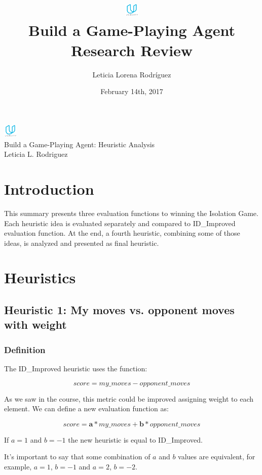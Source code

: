 \documentclass[10pt, a4paper,english]{article}
\author{\normalsize{Leticia Lorena Rodr\'iguez}}
\date{\normalsize{February 14th, 2017}} %
\title{
	\includegraphics[width=0.05\textwidth]{udacity-small.png}\\
Build a Game-Playing Agent \\
\large {Research Review}
} %
\begin{document}
\begin{center}

\includegraphics[width=0.05\textwidth]{udacity-small.png}\\
Build a Game-Playing Agent: Heuristic Analysis \\
Leticia L. Rodriguez \\
\end{center}

\section{Introduction}

This summary presents three evaluation functions to winning the Isolation Game.\\ 

Each heuristic idea is evaluated separately and compared to ID\_Improved evaluation function. At the end, a fourth heuristic, combining some of those ideas, is analyzed and presented as final heuristic.\\

\section{Heuristics}

\subsection{Heuristic 1: My moves vs. opponent moves with weight}

\subsubsection{Definition}

The ID\_Improved heuristic uses the function:

\[
	score = my\_moves - opponent\_moves
\]

As we saw in the course, this metric could be improved assigning weight to each element. We can define a new evaluation function as:

\[
	score = \textbf{a}*my\_moves + \textbf{b}*opponent\_moves
\]

If $a=1$ and $b=-1$ the new heuristic is equal to ID\_Improved.

It's important to say that some combination of $a$ and $b$ values are equivalent, for example, $a=1$, $b=-1$ and $a=2$, $b=-2$. 
\end{document}
